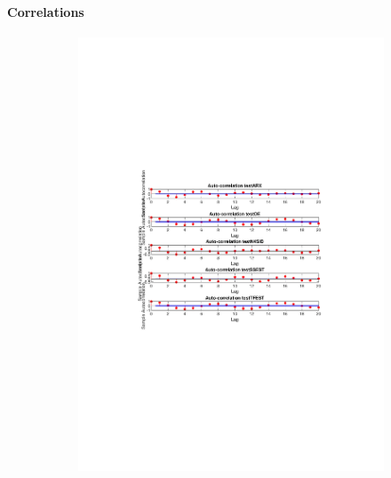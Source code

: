 \documentclass[]{article}
\begin{document}
\paragraph{Correlations}
\begin{figure}[ht]
\centering
\begin{subfigure}{.49\textwidth}
	\centering
	\includegraphics[trim= 10cm 8cm 10cm 8cm, scale=0.4]{figures/auto-corr-1step.pdf}
\end{subfigure}
\begin{subfigure}{.49\textwidth}
	\centering

\end{subfigure}
\end{figure}
\end{document}
